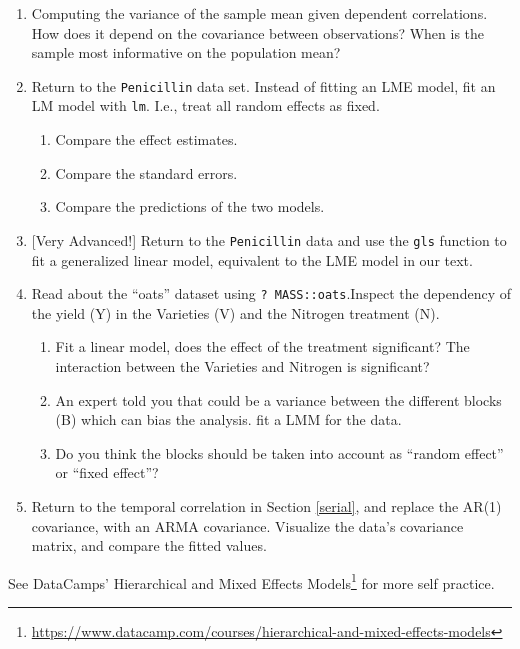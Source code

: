\documentclass[]{book}
\providecommand{\tightlist}{%
  \setlength{\itemsep}{0pt}\setlength{\parskip}{0pt}}
\renewcommand{\href}[2]{#2\footnote{\url{#1}}}
\theoremstyle{definition}
\theoremstyle{definition}
\theoremstyle{definition}
\theoremstyle{remark}
\begin{document}
\begin{enumerate}
\def\labelenumi{\arabic{enumi}.}
\item
  Computing the variance of the sample mean given dependent correlations. How does it depend on the covariance between observations? When is the sample most informative on the population mean?
\item
  Return to the \texttt{Penicillin} data set. Instead of fitting an LME model, fit an LM model with \texttt{lm}. I.e., treat all random effects as fixed.

  \begin{enumerate}
  \def\labelenumii{\alph{enumii}.}
  \tightlist
  \item
    Compare the effect estimates.
  \item
    Compare the standard errors.
  \item
    Compare the predictions of the two models.
  \end{enumerate}
\item
  {[}Very Advanced!{]} Return to the \texttt{Penicillin} data and use the \texttt{gls} function to fit a generalized linear model, equivalent to the LME model in our text.
\item
  Read about the ``oats'' dataset using \texttt{?\ MASS::oats}.Inspect the dependency of the yield (Y) in the Varieties (V) and the Nitrogen treatment (N).

  \begin{enumerate}
  \def\labelenumii{\arabic{enumii}.}
  \tightlist
  \item
    Fit a linear model, does the effect of the treatment significant? The interaction between the Varieties and Nitrogen is significant?
  \item
    An expert told you that could be a variance between the different blocks (B) which can bias the analysis. fit a LMM for the data.
  \item
    Do you think the blocks should be taken into account as ``random effect'' or ``fixed effect''?
  \end{enumerate}
\item
  Return to the temporal correlation in Section \ref{serial}, and replace the AR(1) covariance, with an ARMA covariance. Visualize the data's covariance matrix, and compare the fitted values.
\end{enumerate}

See DataCamps' \href{https://www.datacamp.com/courses/hierarchical-and-mixed-effects-models}{Hierarchical and Mixed Effects Models} for more self practice.
\end{document}
